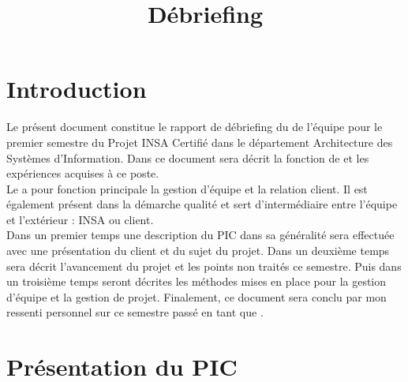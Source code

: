 \documentclass[asi]{picInsa}
\title{Débriefing \CP{}}
\author{\Sergi}
\begin{document}
\couverture{}

\informationsGenerales{}
%
\begin{pagesService}
	\begin{historique}

	\end{historique}

        \begin{signatures}
        \end{signatures}
\end{pagesService}

\tableofcontents

\setcounter{chapter}{0}

\chapter{Introduction}
\label{Introduction}
Le présent document constitue le rapport de débriefing du \CP{} de l'équipe \nomEquipe{} pour le premier semestre du Projet INSA Certifié dans le département Architecture des Systèmes d'Information. Dans ce document sera décrit la fonction de \CP{} et les expériences acquises à ce poste.\vspace{0.5cm}\\
Le \CP{} a pour fonction principale la gestion d'équipe et la relation client. Il est également présent dans la démarche qualité et sert d'intermédiaire entre l'équipe et l'extérieur : INSA ou client.\vspace{0.5cm}\\
Dans un premier temps une description du PIC dans sa généralité sera effectuée avec une présentation du client et du sujet du projet. Dans un deuxième temps sera décrit l'avancement du projet et les points non traités ce semestre. Puis dans un troisième temps seront décrites les méthodes mises en place pour la gestion d'équipe et la gestion de projet. Finalement, ce document sera conclu par mon ressenti personnel sur ce semestre passé en tant que \CP.




\chapter{Présentation du PIC}
\label{presentation_PIC}
\end{document}

